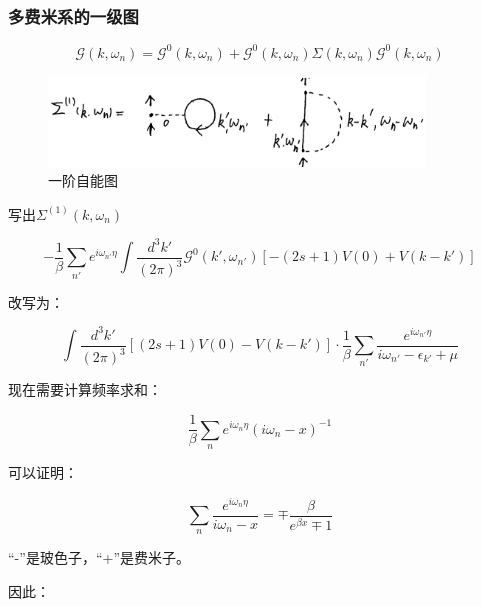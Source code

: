 \subsubsection{多费米系的一级图}

\begin{equation}
\mathcal{G}(k, \omega_n) = \mathcal{G}^0 (k, \omega_n) + \mathcal{G}^0 (k, \omega_n) \Sigma (k, \omega_n) \mathcal{G}^0  (k, \omega_n)   
\end{equation}

\begin{figure}[htbp]
\begin{center}
\includegraphics[width=10cm]{1stselfenergy.png}
\caption{一阶自能图}
\end{center}
\end{figure}


写出$\Sigma^{(1)}(k, \omega_n)$

\begin{equation}
 - \frac{1}{\beta} \sum\limits_{n'} e^{i \omega_{n'} \eta} \int  \frac{d^3 k'} {(2 \pi)^3} \mathcal{G}^0 (k', \omega_{n'}) \left[ -(2s+1) V(0) + V(k - k')  \right]
\end{equation}

改写为：

\begin{equation*}
\int \frac{d^3 k'}{(2 \pi)^3} \left[ (2s+1) V(0) - V(k-k') \right] \cdot \frac{1}{\beta} \sum\limits_{n'} \frac{e^{i \omega_{n'} \eta} }{ i \omega_{n'}  - \epsilon_{k'} + \mu }
\end{equation*}

现在需要计算频率求和：

\begin{equation}
\frac{1}{\beta} \sum\limits_n e^{i \omega_n \eta} (i \omega_n - x )^{-1}
\end{equation}

可以证明：

\begin{equation}
\sum\limits_n \frac{ e^{ i \omega_n \eta } }{ i \omega_n - x } = \mp \frac{\beta}{  e^{\beta x} \mp 1 }
\end{equation}

“-”是玻色子，“+”是费米子。

因此：

